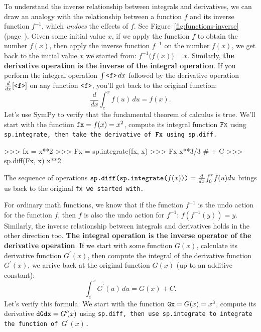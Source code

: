 		
		To understand the inverse relationship between integrals and derivatives,
		we can draw an analogy with the relationship between a function $f$
		and its inverse function $f^{-1}$,
		which \emph{undoes} the effects of $f$.
		See Figure~\ref{fig:functions-inverse} (page~\pageref{fig:functions-inverse}).
		Given some initial value $x$,
		if we apply the function $f$ to obtain the number $f(x)$,
		then apply the inverse function $f^{-1}$ on the number $f(x)$,
		we get back to the initial value $x$ we started from:
		$f^{-1}\big( f(x) \big) = x$.
		Similarly,
		\textbf{the derivative operation is the inverse of the integral operation}.
		If you perform the integral operation $\int \tt{<f>}\,dx$
		followed by the derivative operation $\frac{d}{dx}[\tt{<f>}]$ on any function $\tt{<f>}$,
		you'll get back to the original function:
		\[
			\frac{d}{dx} \int_c^x f(u)\,du = f(x).
		\]
		Let's use SymPy to verify that the fundamental theorem of calculus is true.
		We'll start with the function $\tt{fx} = f(x) = x^2$,
		compute its integral function $\tt{Fx}$ using \tt{sp.integrate},
		then take the derivative of $\tt{Fx}$ using \tt{sp.diff}.

		\begin{codeblock}[]
		>>> fx = x**2
		>>> Fx = sp.integrate(fx, x)
		>>> Fx
		x**3/3           # + C
		>>> sp.diff(Fx, x)
		x**2
		\end{codeblock}

		\noindent
		The sequence of operations
		$\tt{sp.diff(sp.integrate(}f(x)\tt{))} = \frac{d}{dx}\!\int_0^x \!f(u)du$
		brings us back to the original \tt{fx} we started~with.


		For ordinary math functions,
		we know that if the function $f^{-1}$ is the undo action for the function $f$,
		then $f$ is also the undo action for $f^{-1}$:
		$f\!\left( f^{-1}(y) \right) = y$.
		Similarly,
		the inverse relationship between integrals and derivatives holds in the other direction too.
		\textbf{The integral operation is the inverse operator of the derivative operation}.
		If we start with some function $G(x)$,
		calculate its derivative function $G^{\prime\!}(x)$,
		then compute the integral of the derivative function $G^{\prime\!}(x)$,
		we arrive back at the original function $G(x)$
		(up to an additive constant):
		\[
			\int_c^x G^{\prime\!}(u)\,du = G(x) + C.
		\]
		Let's verify this formula.
		We start with the function $\tt{Gx} = G(x) = x^3$,
		compute its derivative $\tt{dGdx} = G^{\prime\!}(x)$ using \tt{sp.diff},
		then use \tt{sp.integrate} to integrate the function of $G^{\prime\!}(x)$.

